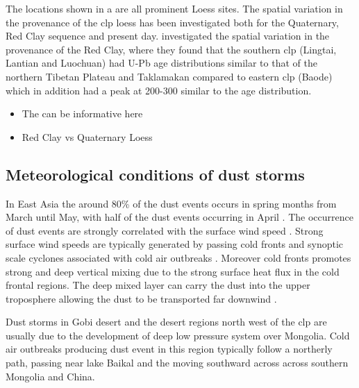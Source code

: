 The locations shown in a are all prominent Loess sites. The spatial variation in the provenance of the \acrshort{clp} loess has been investigated both for the Quaternary, Red Clay sequence and present day\parencite{shang2016variations}. \textcite{shang2016variations} investigated the spatial variation in the provenance of the Red Clay, where they found that the southern \acrshort{clp}  (Lingtai, Lantian and Luochuan) had U-Pb age distributions similar to that of the northern Tibetan Plateau and Taklamakan compared to eastern \acrshort{clp} (Baode) which in addition had a peak at 200-300 similar to the age distribution. 
\begin{itemize}
    \item The \textcite{sun2003seasonal} can be informative here
    \item Red Clay vs Quaternary Loess
    
\end{itemize}



\subsection{Meteorological conditions of dust storms}
In East Asia the around 80\% of the dust events occurs in spring months from March until May, with half of the dust events occurring in April \parencite{sun2001spatial}. The occurrence of dust events are strongly correlated with the surface wind speed \parencite{kurosaki2003recent}. Strong surface wind speeds are typically generated by passing cold fronts and synoptic scale cyclones associated with cold air outbreaks \parencite{sun2001spatial, zhou2003typical, takemi2005dust}.
Moreover cold fronts promotes strong and deep vertical mixing due to the strong surface heat flux in the cold frontal regions. The deep mixed layer can carry the dust into the upper troposphere allowing the dust to be transported far downwind \parencite{liu2003high}. 
  
Dust storms in Gobi desert and the desert regions north west of the \acrshort{clp} are usually due to the development of deep low pressure system over Mongolia. Cold air outbreaks producing dust event in this region typically follow a northerly path, passing near lake Baikal and the moving southward across across southern Mongolia and China.     


